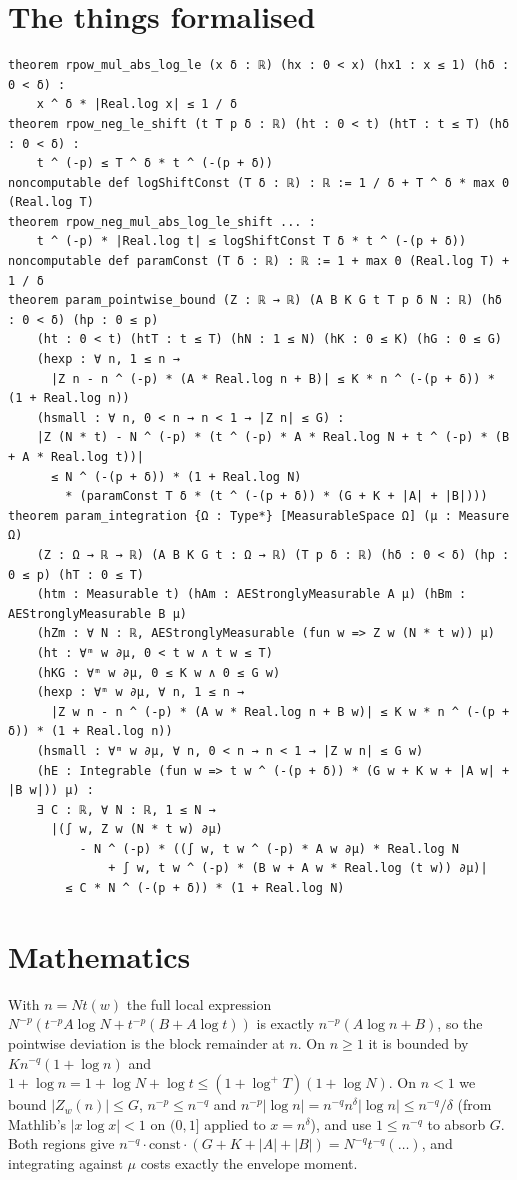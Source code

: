\documentclass[11pt]{article}
\begin{document}
\section{The things formalised}
{\small
\begin{verbatim}
theorem rpow_mul_abs_log_le (x δ : ℝ) (hx : 0 < x) (hx1 : x ≤ 1) (hδ : 0 < δ) :
    x ^ δ * |Real.log x| ≤ 1 / δ
theorem rpow_neg_le_shift (t T p δ : ℝ) (ht : 0 < t) (htT : t ≤ T) (hδ : 0 < δ) :
    t ^ (-p) ≤ T ^ δ * t ^ (-(p + δ))
noncomputable def logShiftConst (T δ : ℝ) : ℝ := 1 / δ + T ^ δ * max 0 (Real.log T)
theorem rpow_neg_mul_abs_log_le_shift ... :
    t ^ (-p) * |Real.log t| ≤ logShiftConst T δ * t ^ (-(p + δ))
noncomputable def paramConst (T δ : ℝ) : ℝ := 1 + max 0 (Real.log T) + 1 / δ
theorem param_pointwise_bound (Z : ℝ → ℝ) (A B K G t T p δ N : ℝ) (hδ : 0 < δ) (hp : 0 ≤ p)
    (ht : 0 < t) (htT : t ≤ T) (hN : 1 ≤ N) (hK : 0 ≤ K) (hG : 0 ≤ G)
    (hexp : ∀ n, 1 ≤ n →
      |Z n - n ^ (-p) * (A * Real.log n + B)| ≤ K * n ^ (-(p + δ)) * (1 + Real.log n))
    (hsmall : ∀ n, 0 < n → n < 1 → |Z n| ≤ G) :
    |Z (N * t) - N ^ (-p) * (t ^ (-p) * A * Real.log N + t ^ (-p) * (B + A * Real.log t))|
      ≤ N ^ (-(p + δ)) * (1 + Real.log N)
        * (paramConst T δ * (t ^ (-(p + δ)) * (G + K + |A| + |B|)))
theorem param_integration {Ω : Type*} [MeasurableSpace Ω] (μ : Measure Ω)
    (Z : Ω → ℝ → ℝ) (A B K G t : Ω → ℝ) (T p δ : ℝ) (hδ : 0 < δ) (hp : 0 ≤ p) (hT : 0 ≤ T)
    (htm : Measurable t) (hAm : AEStronglyMeasurable A μ) (hBm : AEStronglyMeasurable B μ)
    (hZm : ∀ N : ℝ, AEStronglyMeasurable (fun w => Z w (N * t w)) μ)
    (ht : ∀ᵐ w ∂μ, 0 < t w ∧ t w ≤ T)
    (hKG : ∀ᵐ w ∂μ, 0 ≤ K w ∧ 0 ≤ G w)
    (hexp : ∀ᵐ w ∂μ, ∀ n, 1 ≤ n →
      |Z w n - n ^ (-p) * (A w * Real.log n + B w)| ≤ K w * n ^ (-(p + δ)) * (1 + Real.log n))
    (hsmall : ∀ᵐ w ∂μ, ∀ n, 0 < n → n < 1 → |Z w n| ≤ G w)
    (hE : Integrable (fun w => t w ^ (-(p + δ)) * (G w + K w + |A w| + |B w|)) μ) :
    ∃ C : ℝ, ∀ N : ℝ, 1 ≤ N →
      |(∫ w, Z w (N * t w) ∂μ)
          - N ^ (-p) * ((∫ w, t w ^ (-p) * A w ∂μ) * Real.log N
              + ∫ w, t w ^ (-p) * (B w + A w * Real.log (t w)) ∂μ)|
        ≤ C * N ^ (-(p + δ)) * (1 + Real.log N)
\end{verbatim}
}

\section{Mathematics}

With $n=Nt(w)$ the full local expression $N^{-p}(t^{-p}A\log N+t^{-p}(B+A\log t))$ is exactly
$n^{-p}(A\log n+B)$, so the pointwise deviation is the block remainder at $n$. On $n\ge1$ it is
bounded by $Kn^{-q}(1+\log n)$ and $1+\log n=1+\log N+\log t\le(1+\log^+T)(1+\log N)$. On $n<1$
we bound $|Z_w(n)|\le G$, $n^{-p}\le n^{-q}$ and $n^{-p}|\log n|=n^{-q}n^\delta|\log n|\le n^{-q}/\delta$
(from Mathlib's $|x\log x|<1$ on $(0,1]$ applied to $x=n^\delta$), and use $1\le n^{-q}$ to absorb
$G$. Both regions give $n^{-q}\cdot\mathrm{const}\cdot(G+K+|A|+|B|)=N^{-q}t^{-q}(\dots)$, and
integrating against $\mu$ costs exactly the envelope moment.
\end{document}
